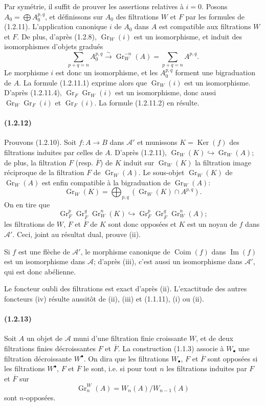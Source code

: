 \documentclass[10pt]{article}
\newcommand{\Gr}{\operatorname{Gr}}
\newcommand{\Ker}{\operatorname{Ker}}
\newcommand{\Coim}{\operatorname{Coim}}
\newcommand{\Imop}{\operatorname{Im}}
\newcommand{\fg}{\guillemotright}
\newcommand{\og}{\guillemotleft}
\newcommand{\calA}{\mathcal A}
\newcommand{\iso}{\xrightarrow{\sim}}
\begin{document}
Par symétrie, il suffit de prouver les assertions relatives à $i=0$. Posons $A_0=\bigoplus A_0^{p,q}$, et définissons sur $A_0$ des filtrations $W$ et $F$ par les formules de (1.2.11). L'application canonique $i$ de $A_0$ dans $A$ est compatible aux filtrations $W$ et $F$. De plus, d'après (1.2.8), $\Gr_W(i)$ est un isomorphisme, et induit des isomorphismes d'objets gradués
\[
\tag{1.2.11.4}
\sum_{p+q=n} A_0^{p,q}\iso \Gr_W^{-n}(A)=\sum_{p+q=n}A^{p,q}.
\]
Le morphisme $i$ est donc un isomorphisme, et les $A_0^{p,q}$ forment une bigraduation de $A$. La formule (1.2.11.1) exprime alors que $\Gr_W(i)$ est un isomorphisme. D'après (1.2.11.4), $\Gr_F\Gr_W(i)$ est un isomorphisme, donc aussi $\Gr_W\Gr_F(i)$ et $\Gr_F(i)$. La formule (1.2.11.2) en résulte.

\paragraph{(1.2.12)} Prouvons (1.2.10). Soit $f:A\to B$ dans $\calA'$ et munissons $K=\Ker(f)$ des filtrations induites par celles de $A$. D'après (1.2.11), $\Gr_W(K)\hookrightarrow\Gr_W(A)$; de plus, la filtration $F$ (resp. $\overline F$) de $K$ induit sur $\Gr_W(K)$ la filtration image réciproque de la filtration $F$ de $\Gr_W(A)$. Le sous-objet $\Gr_W(K)$ de $\Gr_W(A)$ est enfin compatible à la bigraduation de $\Gr_W(A)$:
\[
\Gr_W(K)=\bigoplus_{p,q}(\Gr_W(K)\cap A^{p,q}).
\]
On en tire que
\[
\Gr_F^p\Gr_{\overline F}^{q}\Gr_W^n(K)\hookrightarrow \Gr_F^p\Gr_{\overline F}^{q}\Gr_W^n(A);
\]
les filtrations de $W$, $F$ et $\overline F$ de $K$ sont donc opposées et $K$ est un noyau de $f$ dans $\calA'$. Ceci, joint au résultat dual, prouve (ii).

Si $f$ est une flèche de $\calA'$, le morphisme canonique de $\Coim(f)$ dans $\Imop(f)$ est un isomorphisme dans $\calA$; d'après (iii), c'est aussi un isomorphisme dans $\calA'$, qui est donc abélienne.

Le foncteur \og oubli des filtrations\fg{} est exact d'après (ii). L'exactitude des autres foncteurs (iv) résulte aussitôt de (ii), (iii) et (1.1.11), (i) ou (ii).

\paragraph{(1.2.13)} Soit $A$ un objet de $\calA$ muni d'une filtration finie croissante $W$, et de deux filtrations finies décroissantes $F$ et $\overline F$. La construction (1.1.3) associe à $W_\bullet$ une filtration décroissante $W^\bullet$. On dira que les filtrations $W_\bullet$, $F$ et $\overline F$ sont opposées si les filtrations $W^\bullet$, $F$ et $\overline F$ le sont, i.e. si pour tout $n$ les filtrations induites par $F$ et $\overline F$ sur
\[
\Gr_n^W(A)=W_n(A)/W_{n-1}(A)
\]
sont $n$-opposées.
\end{document}
